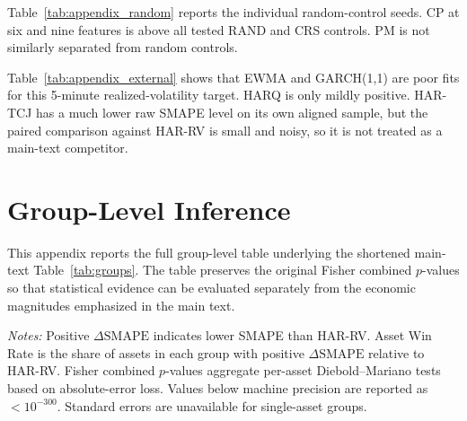 ﻿\documentclass[11pt,a4paper]{article}
\begin{document}
\noindent
Table~\ref{tab:appendix_random} reports the individual random-control seeds. CP at six and nine features is above all tested RAND and CRS controls. PM is not similarly separated from random controls.

{\renewcommand{\thetable}{D5}
\begin{center}
\label{tab:appendix_external}
\scriptsize
\renewcommand{\arraystretch}{1.08}
\resizebox{0.62\textwidth}{!}{}
\end{center}}

\noindent
Table~\ref{tab:appendix_external} shows that EWMA and GARCH(1,1) are poor fits for this 5-minute realized-volatility target. HARQ is only mildly positive. HAR-TCJ has a much lower raw SMAPE level on its own aligned sample, but the paired comparison against HAR-RV is small and noisy, so it is not treated as a main-text competitor.


\clearpage

\section{Group-Level Inference}

\noindent
This appendix reports the full group-level table underlying the shortened main-text Table~\ref{tab:groups}. The table preserves the original Fisher combined $p$-values so that statistical evidence can be evaluated separately from the economic magnitudes emphasized in the main text.

{\renewcommand{\thetable}{E1}
\begin{center}
\label{tab:groups_full}
\small
\renewcommand{\arraystretch}{1.15}
\setlength{\tabcolsep}{8pt}
\resizebox{0.88\textwidth}{!}{}

\vspace{0.1cm}
\footnotesize \parbox{0.92\textwidth}{\textit{Notes:} Positive $\Delta \mathrm{SMAPE}$ indicates lower SMAPE than HAR-RV. Asset Win Rate is the share of assets in each group with positive $\Delta \mathrm{SMAPE}$ relative to HAR-RV. Fisher combined $p$-values aggregate per-asset Diebold--Mariano tests based on absolute-error loss. Values below machine precision are reported as $< 10^{-300}$. Standard errors are unavailable for single-asset groups.}
\end{center}}
\end{document}

